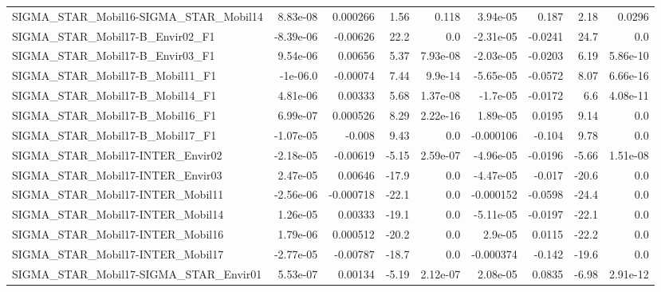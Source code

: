 \begin{tabular}{lrrrrrrrr}
SIGMA\_STAR\_Mobil16-SIGMA\_STAR\_Mobil14     &    8.83e-08 &     0.000266 &    1.56 &    0.118 &   3.94e-05 &       0.187 &         2.18 &        0.0296 \\
SIGMA\_STAR\_Mobil17-B\_Envir02\_F1           &   -8.39e-06 &     -0.00626 &    22.2 &      0.0 &  -2.31e-05 &     -0.0241 &         24.7 &           0.0 \\
SIGMA\_STAR\_Mobil17-B\_Envir03\_F1           &    9.54e-06 &      0.00656 &    5.37 & 7.93e-08 &  -2.03e-05 &     -0.0203 &         6.19 &      5.86e-10 \\
SIGMA\_STAR\_Mobil17-B\_Mobil11\_F1           &    -1e-06.0 &     -0.00074 &    7.44 &  9.9e-14 &  -5.65e-05 &     -0.0572 &         8.07 &      6.66e-16 \\
SIGMA\_STAR\_Mobil17-B\_Mobil14\_F1           &    4.81e-06 &      0.00333 &    5.68 & 1.37e-08 &   -1.7e-05 &     -0.0172 &          6.6 &      4.08e-11 \\
SIGMA\_STAR\_Mobil17-B\_Mobil16\_F1           &    6.99e-07 &     0.000526 &    8.29 & 2.22e-16 &   1.89e-05 &      0.0195 &         9.14 &           0.0 \\
SIGMA\_STAR\_Mobil17-B\_Mobil17\_F1           &   -1.07e-05 &       -0.008 &    9.43 &      0.0 &  -0.000106 &      -0.104 &         9.78 &           0.0 \\
SIGMA\_STAR\_Mobil17-INTER\_Envir02          &   -2.18e-05 &     -0.00619 &   -5.15 & 2.59e-07 &  -4.96e-05 &     -0.0196 &        -5.66 &      1.51e-08 \\
SIGMA\_STAR\_Mobil17-INTER\_Envir03          &    2.47e-05 &      0.00646 &   -17.9 &      0.0 &  -4.47e-05 &      -0.017 &        -20.6 &           0.0 \\
SIGMA\_STAR\_Mobil17-INTER\_Mobil11          &   -2.56e-06 &    -0.000718 &   -22.1 &      0.0 &  -0.000152 &     -0.0598 &        -24.4 &           0.0 \\
SIGMA\_STAR\_Mobil17-INTER\_Mobil14          &    1.26e-05 &      0.00333 &   -19.1 &      0.0 &  -5.11e-05 &     -0.0197 &        -22.1 &           0.0 \\
SIGMA\_STAR\_Mobil17-INTER\_Mobil16          &    1.79e-06 &     0.000512 &   -20.2 &      0.0 &    2.9e-05 &      0.0115 &        -22.2 &           0.0 \\
SIGMA\_STAR\_Mobil17-INTER\_Mobil17          &   -2.77e-05 &     -0.00787 &   -18.7 &      0.0 &  -0.000374 &      -0.142 &        -19.6 &           0.0 \\
SIGMA\_STAR\_Mobil17-SIGMA\_STAR\_Envir01     &    5.53e-07 &      0.00134 &   -5.19 & 2.12e-07 &   2.08e-05 &      0.0835 &        -6.98 &      2.91e-12 \\

\end{tabular}
